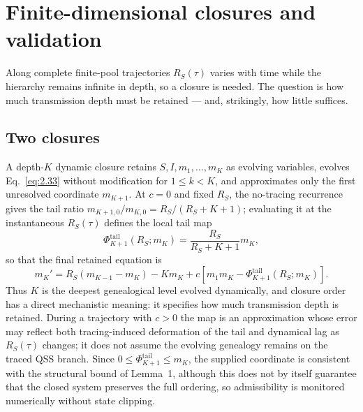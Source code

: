 \documentclass[review,12pt]{elsarticle}
\numberwithin{equation}{section}
\theoremstyle{remark}
\begin{document}
\section{Finite-dimensional closures and validation}\label{sec5}

Along complete finite-pool trajectories $R_S(\tau)$ varies with time while the hierarchy remains infinite in depth, so a closure is needed. The question is how much transmission depth must be retained --- and, strikingly, how little suffices.

\subsection{Two closures}\label{subsec5.1}

A depth-$K$ dynamic closure retains $S,I,m_1,\ldots,m_K$ as evolving variables, evolves Eq.~\eqref{eq:2.33} without modification for $1\leq k<K$, and approximates only the first unresolved coordinate $m_{K+1}$. At $c=0$ and fixed $R_S$, the no-tracing recurrence gives the tail ratio $m_{K+1,0}/m_{K,0}=R_S/(R_S+K+1)$; evaluating it at the instantaneous $R_S(\tau)$ defines the local tail map
\begin{equation}
\Phi_{K+1}^{\mathrm{tail}}(R_S;m_K) = \frac{R_S}{R_S+K+1}m_K,
\label{eq:7.2}
\end{equation}
so that the final retained equation is
\begin{equation}
m_K' = R_S(m_{K-1}-m_K) - K m_K + c\left[m_1 m_K - \Phi_{K+1}^{\mathrm{tail}}(R_S;m_K)\right].
\label{eq:7.3}
\end{equation}
Thus $K$ is the deepest genealogical level evolved dynamically, and closure order has a direct mechanistic meaning: it specifies how much transmission depth is retained. During a trajectory with $c>0$ the map is an approximation whose error may reflect both tracing-induced deformation of the tail and dynamical lag as $R_S(\tau)$ changes; it does not assume the evolving genealogy remains on the traced QSS branch. Since $0\leq\Phi_{K+1}^{\mathrm{tail}}\leq m_K$, the supplied coordinate is consistent with the structural bound of Lemma~1, although this does not by itself guarantee that the closed system preserves the full ordering, so admissibility is monitored numerically without state clipping.
\end{document}
